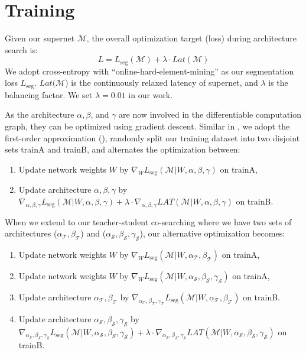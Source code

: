 \documentclass{article} \usepackage{iclr2020_conference,times}
\begin{document}
\section{Training}\vspace{-0.7em} \label{app:training}

Given our supernet $\mathcal{M}$, the overall optimization target (loss) during architecture search is:
\begin{equation}
    L = L_{\mathrm{seg}}(\mathcal{M}) + \lambda \cdot Lat(\mathcal{M})
    \label{eq:loss}
\end{equation}
We adopt cross-entropy with ``online-hard-element-mining'' as our segmentation loss $L_{\mathrm{seg}}$. $Lat(\mathcal{M}$) is the continuously relaxed latency of supernet, and $\lambda$ is the balancing factor. We set $\lambda = 0.01$ in our work.

As the architecture $\alpha, \beta$, and $\gamma$ are now involved in the differentiable computation graph, they can be optimized using gradient descent. Similar in \citep{liu2019auto}, we adopt the first-order approximation (\citep{liu2018darts}), randomly split our training dataset into two disjoint sets trainA and trainB, and alternates the optimization between:
\begin{enumerate}
    \item Update network weights $W$ by $\nabla_W L_\mathrm{seg}(\mathcal{M}|W, \alpha, \beta, \gamma)$ on trainA,
    \item Update architecture $\alpha, \beta, \gamma$ by $\nabla_{\alpha, \beta, \gamma} L_\mathrm{seg}(\mathcal{M}|W, \alpha, \beta, \gamma) + \lambda \cdot \nabla_{\alpha, \beta, \gamma} LAT(\mathcal{M}|W, \alpha, \beta, \gamma)$ on trainB.
\end{enumerate}
When we extend to our teacher-student co-searching where we have two sets of architectures ($\alpha_\mathcal{T}, \beta_\mathcal{T}$) and ($\alpha_\mathcal{S}, \beta_\mathcal{S}, \gamma_\mathcal{S}$), our alternative optimization becomes:
\begin{enumerate}
    \item Update network weights $W$ by $\nabla_W L_\mathrm{seg}(\mathcal{M}|W, \alpha_\mathcal{T}, \beta_\mathcal{T})$ on trainA,
    \item Update network weights $W$ by $\nabla_W L_\mathrm{seg}(\mathcal{M}|W, \alpha_\mathcal{S}, \beta_\mathcal{S}, \gamma_\mathcal{S})$ on trainA,
    \item Update architecture $\alpha_\mathcal{T}, \beta_\mathcal{T}$ by $\nabla_{\alpha_\mathcal{T}, \beta_\mathcal{T}, \gamma_\mathcal{T}} L_\mathrm{seg}(\mathcal{M}|W, \alpha_\mathcal{T}, \beta_\mathcal{T})$ on trainB.
    \item Update architecture $\alpha_\mathcal{S}, \beta_\mathcal{S}, \gamma_\mathcal{S}$ by $\nabla_{\alpha_\mathcal{S}, \beta_\mathcal{S}, \gamma_\mathcal{S}} L_\mathrm{seg}(\mathcal{M}|W, \alpha_\mathcal{S}, \beta_\mathcal{S}, \gamma_\mathcal{S}) + \lambda \cdot \nabla_{\alpha_\mathcal{S}, \beta_\mathcal{S}, \gamma_\mathcal{S}} LAT(\mathcal{M}|W, \alpha_\mathcal{S}, \beta_\mathcal{S}, \gamma_\mathcal{S})$ on trainB.
\end{enumerate}
\end{document}
